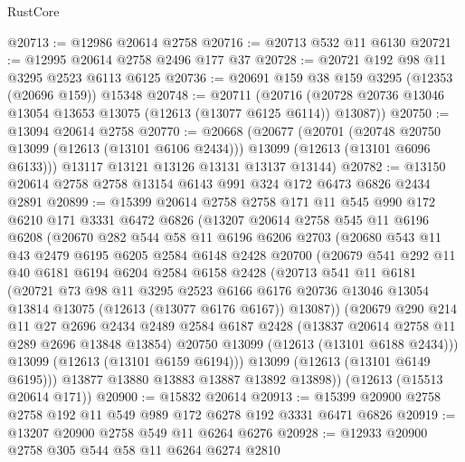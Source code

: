 \begin{lexlean}{RustCore}
\begin{coremodule}
@20713 := @12986 @20614 @2758
@20716 := @20713 @532 @11 @6130
@20721 := @12995 @20614 @2758 @2496 @177 @37
@20728 := @20721 @192 @98 @11 @3295 @2523 @6113 @6125
@20736 := @20691 @159 @38 @159 @3295 (@12353 (@20696 @159)) @15348
@20748 := @20711
    (@20716 (@20728 @20736 @13046 @13054 @13653 @13075 (@12613 (@13077 @6125 @6114)) @13087))
@20750 := @13094 @20614 @2758
@20770 := @20668
    (@20677
      (@20701
        (@20748 @20750 @13099 (@12613 (@13101 @6106 @2434)))
        @13099
        (@12613 (@13101 @6096 @6133)))
      @13117
      @13121
      @13126
      @13131
      @13137
      @13144)
@20782 := @13150 @20614 @2758 @2758 @13154 @6143 @991 @324 @172 @6473 @6826 @2434 @2891
@20899 := @15399
    @20614
    @2758
    @2758
    @171
    @11
    @545
    @990
    @172
    @6210
    @171
    @3331
    @6472
    @6826
    (@13207
      @20614
      @2758
      @545
      @11
      @6196
      @6208
      (@20670
        @282
        @544
        @58
        @11
        @6196
        @6206
        @2703
        (@20680
          @543
          @11
          @43
          @2479
          @6195
          @6205
          @2584
          @6148
          @2428
          @20700
          (@20679
            @541
            @292
            @11
            @40
            @6181
            @6194
            @6204
            @2584
            @6158
            @2428
            (@20713
              @541
              @11
              @6181
              (@20721
                @73
                @98
                @11
                @3295
                @2523
                @6166
                @6176
                @20736
                @13046
                @13054
                @13814
                @13075
                (@12613 (@13077 @6176 @6167))
                @13087))
            (@20679
              @290
              @214
              @11
              @27
              @2696
              @2434
              @2489
              @2584
              @6187
              @2428
              (@13837 @20614 @2758 @11 @289 @2696 @13848 @13854)
              @20750
              @13099
              (@12613 (@13101 @6188 @2434)))
            @13099
            (@12613 (@13101 @6159 @6194)))
          @13099
          (@12613 (@13101 @6149 @6195)))
        @13877
        @13880
        @13883
        @13887
        @13892
        @13898))
    (@12613 (@15513 @20614 @171))
@20900 := @15832 @20614
@20913 := @15399 @20900 @2758 @2758 @192 @11 @549 @989 @172 @6278 @192 @3331 @6471 @6826
@20919 := @13207 @20900 @2758 @549 @11 @6264 @6276
@20928 := @12933 @20900 @2758 @305 @544 @58 @11 @6264 @6274 @2810

\end{coremodule}
\end{lexlean}
